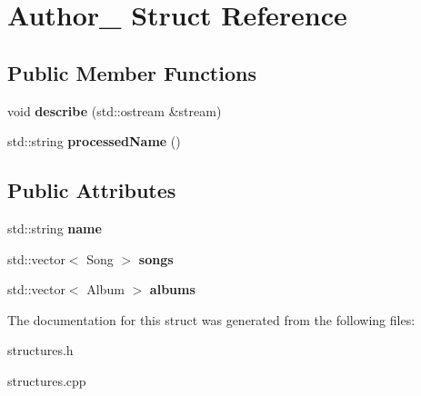 \hypertarget{struct_author__}{}\section{Author\+\_\+ Struct Reference}
\label{struct_author__}
\subsection*{Public Member Functions}
\begin{DoxyCompactItemize}
\item 
void {\bfseries describe} (std\+::ostream \&stream)\hypertarget{struct_author___a9b0dccd6800cdada15353f4099a07793}{}\label{struct_author___a9b0dccd6800cdada15353f4099a07793}

\item 
std\+::string {\bfseries processed\+Name} ()\hypertarget{struct_author___a1e9c33988592236607e0f93226e906e1}{}\label{struct_author___a1e9c33988592236607e0f93226e906e1}

\end{DoxyCompactItemize}
\subsection*{Public Attributes}
\begin{DoxyCompactItemize}
\item 
std\+::string {\bfseries name}\hypertarget{struct_author___a9033f52c9b60dd7abbe05b2975363b5c}{}\label{struct_author___a9033f52c9b60dd7abbe05b2975363b5c}

\item 
std\+::vector$<$ Song $>$ {\bfseries songs}\hypertarget{struct_author___a570029d1a3e6e5532de9ed68d4ee38a4}{}\label{struct_author___a570029d1a3e6e5532de9ed68d4ee38a4}

\item 
std\+::vector$<$ Album $>$ {\bfseries albums}\hypertarget{struct_author___abe54a93ef158880e38afa945d2282f9b}{}\label{struct_author___abe54a93ef158880e38afa945d2282f9b}

\end{DoxyCompactItemize}


The documentation for this struct was generated from the following files\+:\begin{DoxyCompactItemize}
\item 
structures.\+h\item 
structures.\+cpp\end{DoxyCompactItemize}
